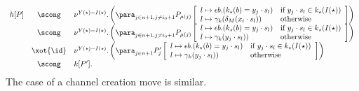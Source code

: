 \documentclass{LMCS}
\theoremstyle{plain}\newtheorem{satz}[thm]{Satz}
\begin{document}
$$\begin{array}{rcl}
h[P] & \scong & \nu^{Y (\star) - I (\star)}. \left (\para_{j \in n+1, j \neq i_0 + 1} P_{\mu(j)} \left [
  \begin{array}[c]{ll}
    l \mapsto \epsilon b.(k_\star(b) = y_j \cdot s_l) & \mbox{if $y_j \cdot s_l \in k_\star (I(\star))$} \\
    l \mapsto \gamma_k(\delta_M(x_i \cdot s_l)) & \mbox{otherwise} 
  \end{array}
\right ] \right ) \\
& \scong & \nu^{Y (\star) - I (\star)}. \left (\para_{j \in n+1, j \neq i_0 + 1} P_{\mu(j)} \left [
  \begin{array}[c]{ll}
    l \mapsto \epsilon b.(k_\star(b) = y_j \cdot s_l) & \mbox{if $y_j \cdot s_l \in k_\star (I(\star))$} \\
    l \mapsto \gamma_k(y_j \cdot s_l)) & \mbox{otherwise} 
  \end{array}
\right ] \right ) \\
& \xot{\id} & \nu^{Y (\star) - I (\star)}. \left (\para_{j \in n + 1} P'_j\left [
  \begin{array}[c]{ll}
    l \mapsto \epsilon b.(k_\star(b) = y_j \cdot s_l) & \mbox{if $y_j \cdot s_l \in k_\star (I(\star))$} \\
    l \mapsto \gamma_k(y_j \cdot s_l)) & \mbox{otherwise} 
  \end{array}
\right ] \right ) \\
& \scong & k[P'].
\end{array}$$
The case of a channel creation move is similar.
\end{document}
